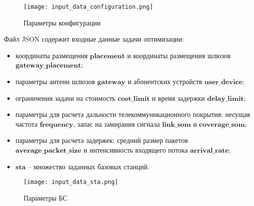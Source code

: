 \begin{figure}[h!]
  \centering
   \texttt{[image: input\_data\_configuration.png]}
\caption{Параметры конфигурации}
\label{fig:part4_input_data_configuration}
\end{figure}

Файл JSON содержит входные данные задачи оптимизации: 
\begin{itemize}
  \item координаты размещения $\textbf{placement}$ и координаты размещения шлюзов $\textbf{gateway\_placement}$;
  \item  параметры антенн шлюзов $\textbf{gateway}$ и абонентских устройств $\textbf{user\_device}$;
  \item ограничения задачи на стоимость $\textbf{cost\_limit}$ и время задержки $\textbf{delay\_limit}$;
  \item параметры для расчета дальности телекоммуникационного покрытия: несущая частота $\textbf{frequency}$, запас на замирания сигнала $\textbf{link\_som}$ и $\textbf{coverage\_som}$;
  \item параметры для расчета задержек: средний размер пакетов $\textbf{average\_packet\_size}$ и интенсивность входящего потока $\textbf{arrival\_rate}$;
  \item $\textbf{sta}$ -- множество заданных базовых станций.
\end{itemize}

\begin{figure}[h!]
  \centering
   \texttt{[image: input\_data\_sta.png]}
\caption{Параметры БС}
\label{fig:part4_input_data_sta}
\end{figure}

